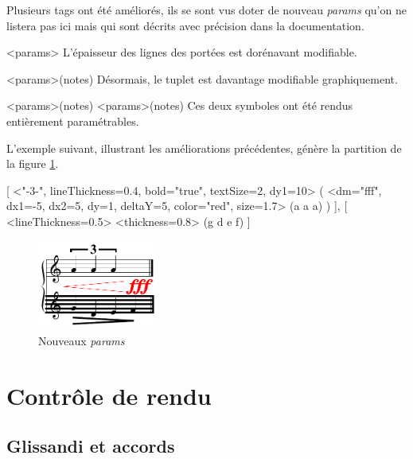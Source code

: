 \documentclass{article}
\newenvironment{gmncode}	{\vspace{-2mm}\small\verbatim}{\endverbatim\vspace{-2mm}}
\begin{document}
Plusieurs tags ont été améliorés, ils se sont vus doter de nouveau \emph{params} qu'on ne listera pas ici mais qui sont décrits avec précision dans la documentation.

\begin{gmncode}
  \staffFormat<params>
    L'épaisseur des lignes des portées est
    dorénavant modifiable.
  
  \tuplet<params>(notes)
    Désormais, le tuplet est davantage
    modifiable graphiquement.
      
  \cresc<params>(notes)
  \decresc<params>(notes)
    Ces deux symboles ont été rendus
    entièrement paramétrables.
\end{gmncode}

L'exemple suivant, illustrant les améliorations précédentes, génère la partition de la figure \ref{fig:nouveauxParams}.

\begin{gmncode}
{
  [
    \tuplet<"-3-", lineThickness=0.4,
        bold="true", textSize=2, dy1=10> (
      \cresc<dm="fff", dx1=-5, dx2=5,
          dy=1, deltaY=5, color="red",
          size=1.7> (a a a)
    )
  ],
  [
    \staffFormat<lineThickness=0.5>
    \decresc<thickness=0.8> (g d e f)
  ]
}
\end{gmncode}

\begin{figure}[h]
\centering
\includegraphics[width=40mm]{img/partitions/nouveauxParams.pdf}
\caption{Nouveaux \emph{params}}
\label{fig:nouveauxParams}
\end{figure}



\section{Contr\^ole de rendu}\label{sec:controleRendu}

\subsection{Glissandi et accords}\label{subsec:glissandiAccords}
\end{document}
